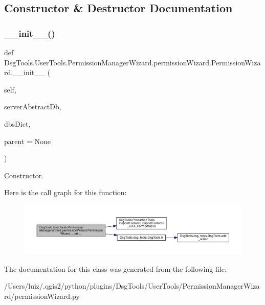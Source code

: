 \subsection{Constructor \& Destructor Documentation}
\mbox{\label{class_dsg_tools_1_1_user_tools_1_1_permission_manager_wizard_1_1permission_wizard_1_1_permission_wizard_a1bc734c9c8070450e9a881fed077bc8c}} 
\subsubsection{\texorpdfstring{\+\_\+\+\_\+init\+\_\+\+\_\+()}{\_\_init\_\_()}}
{\footnotesize\ttfamily def Dsg\+Tools.\+User\+Tools.\+Permission\+Manager\+Wizard.\+permission\+Wizard.\+Permission\+Wizard.\+\_\+\+\_\+init\+\_\+\+\_\+ (\begin{DoxyParamCaption}\item[{}]{self,  }\item[{}]{server\+Abstract\+Db,  }\item[{}]{dbs\+Dict,  }\item[{}]{parent = {\ttfamily None} }\end{DoxyParamCaption})}

\begin{DoxyVerb}Constructor.\end{DoxyVerb}
 Here is the call graph for this function\+:
\nopagebreak
\begin{figure}[H]
\begin{center}
\leavevmode
\includegraphics[width=350pt]{class_dsg_tools_1_1_user_tools_1_1_permission_manager_wizard_1_1permission_wizard_1_1_permission_wizard_a1bc734c9c8070450e9a881fed077bc8c_cgraph}
\end{center}
\end{figure}


The documentation for this class was generated from the following file\+:\begin{DoxyCompactItemize}
\item 
/\+Users/luiz/.\+qgis2/python/plugins/\+Dsg\+Tools/\+User\+Tools/\+Permission\+Manager\+Wizard/permission\+Wizard.\+py\end{DoxyCompactItemize}
